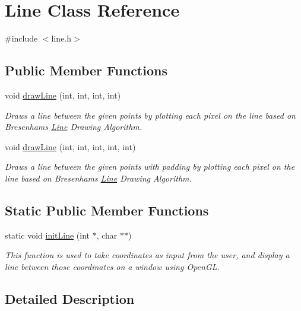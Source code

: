 \hypertarget{class_line}{}\section{Line Class Reference}
\label{class_line}


{\ttfamily \#include $<$line.\+h$>$}

\subsection*{Public Member Functions}
\begin{DoxyCompactItemize}
\item 
void \mbox{\hyperlink{class_line_abba386ec98cac3158d04915a62185b19}{draw\+Line}} (int, int, int, int)
\begin{DoxyCompactList}\small\item\em Draws a line between the given points by plotting each pixel on the line based on Bresenham\textquotesingle{}s \mbox{\hyperlink{class_line}{Line}} Drawing Algorithm. \end{DoxyCompactList}\item 
void \mbox{\hyperlink{class_line_a4e7daa2b6095dc0a1afe6bf4a1e55033}{draw\+Line}} (int, int, int, int, int)
\begin{DoxyCompactList}\small\item\em Draws a line between the given points with padding by plotting each pixel on the line based on Bresenham\textquotesingle{}s \mbox{\hyperlink{class_line}{Line}} Drawing Algorithm. \end{DoxyCompactList}\end{DoxyCompactItemize}
\subsection*{Static Public Member Functions}
\begin{DoxyCompactItemize}
\item 
static void \mbox{\hyperlink{class_line_a4bbe9757d2b364c146dca483bd52023b}{init\+Line}} (int $\ast$, char $\ast$$\ast$)
\begin{DoxyCompactList}\small\item\em This function is used to take coordinates as input from the user, and display a line between those coordinates on a window using Open\+GL. \end{DoxyCompactList}\end{DoxyCompactItemize}


\subsection{Detailed Description}


